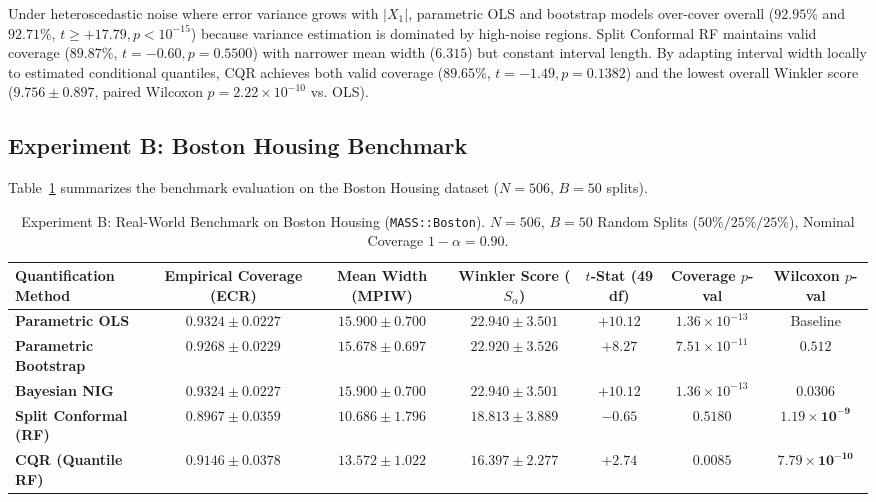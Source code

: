 \documentclass[journal]{IEEEtran}
\begin{document}
Under heteroscedastic noise where error variance grows with $|X_1|$, parametric OLS and bootstrap models over-cover overall ($92.95\%$ and $92.71\%$, $t \ge +17.79, p < 10^{-15}$) because variance estimation is dominated by high-noise regions. Split Conformal RF maintains valid coverage ($89.87\%$, $t = -0.60, p = 0.5500$) with narrower mean width ($6.315$) but constant interval length. By adapting interval width locally to estimated conditional quantiles, CQR achieves both valid coverage ($89.65\%$, $t = -1.49, p = 0.1382$) and the lowest overall Winkler score ($9.756 \pm 0.897$, paired Wilcoxon $p = 2.22 \times 10^{-10}$ vs. OLS).

\subsection{Experiment B: Boston Housing Benchmark}
Table~\ref{tab:boston} summarizes the benchmark evaluation on the Boston Housing dataset ($N = 506$, $B = 50$ splits).

\begin{table}[!t]
\centering
\caption{Experiment B: Real-World Benchmark on Boston Housing (\texttt{MASS::Boston}). $N = 506$, $B = 50$ Random Splits ($50\% / 25\% / 25\%$), Nominal Coverage $1 - \alpha = 0.90$.}
\label{tab:boston}
\begin{tabular}{lcccccc}
\toprule
\textbf{Quantification Method} & \textbf{Empirical Coverage (ECR)} & \textbf{Mean Width (MPIW)} & \textbf{Winkler Score ($S_\alpha$)} & \textbf{$t$-Stat (49 df)} & \textbf{Coverage $p$-val} & \textbf{Wilcoxon $p$-val} \\
\midrule
\textbf{Parametric OLS} & $0.9324 \pm 0.0227$ & $15.900 \pm 0.700$ & $22.940 \pm 3.501$ & $+10.12$ & $1.36 \times 10^{-13}$ & Baseline \\
\textbf{Parametric Bootstrap} & $0.9268 \pm 0.0229$ & $15.678 \pm 0.697$ & $22.920 \pm 3.526$ & $+8.27$ & $7.51 \times 10^{-11}$ & $0.512$ \\
\textbf{Bayesian NIG} & $0.9324 \pm 0.0227$ & $15.900 \pm 0.700$ & $22.940 \pm 3.501$ & $+10.12$ & $1.36 \times 10^{-13}$ & $0.0306$ \\
\textbf{Split Conformal (RF)} & $\mathbf{0.8967} \pm \mathbf{0.0359}$ & $\mathbf{10.686} \pm \mathbf{1.796}$ & $18.813 \pm 3.889$ & $-0.65$ & $0.5180$ & $\mathbf{1.19 \times 10^{-9}}$ \\
\textbf{CQR (Quantile RF)} & $0.9146 \pm 0.0378$ & $13.572 \pm 1.022$ & $\mathbf{16.397} \pm \mathbf{2.277}$ & $+2.74$ & $0.0085$ & $\mathbf{7.79 \times 10^{-10}}$ \\
\bottomrule
\end{tabular}
\end{table}
\end{document}
